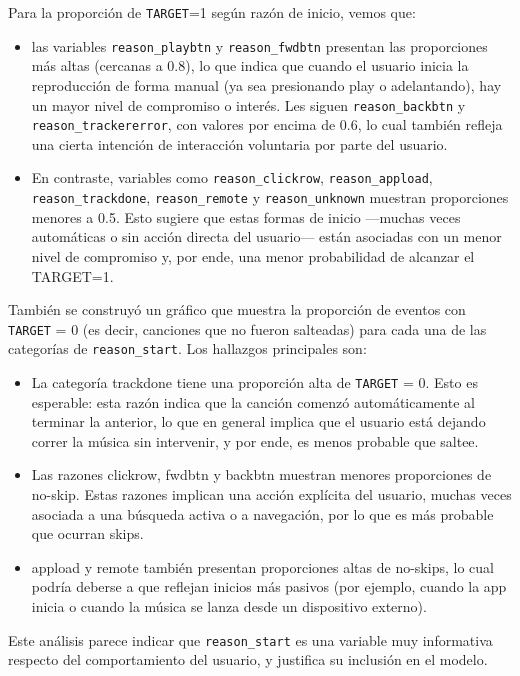 \documentclass{article}
\begin{document}
Para la proporción de \texttt{TARGET}=1 según razón de inicio, vemos que:

\begin{itemize}
	\item las variables \texttt{reason\_playbtn} y \texttt{reason\_fwdbtn} presentan las proporciones más altas (cercanas a 0.8), lo que indica que cuando el usuario inicia la reproducción de forma manual (ya sea presionando play o adelantando), hay un mayor nivel de compromiso o interés. Les siguen \texttt{reason\_backbtn} y \texttt{reason\_trackererror}, con valores por encima de 0.6, lo cual también refleja una cierta intención de interacción voluntaria por parte del usuario.
	\item En contraste, variables como \texttt{reason\_clickrow}, \texttt{reason\_appload}, \texttt{reason\_trackdone}, \texttt{reason\_remote} y \texttt{reason\_unknown} muestran proporciones menores a 0.5. Esto sugiere que estas formas de inicio —muchas veces automáticas o sin acción directa del usuario— están asociadas con un menor nivel de compromiso y, por ende, una menor probabilidad de alcanzar el TARGET=1.
\end{itemize}

También se construyó un gráfico que muestra la proporción de eventos con \texttt{TARGET} = 0 (es decir, canciones que no fueron salteadas) para cada una de las categorías de \texttt{reason\_start}.
Los hallazgos principales son:


\begin{itemize}
	\item La categoría trackdone tiene una proporción alta de \texttt{TARGET} = 0. Esto es esperable: esta razón indica que la canción comenzó automáticamente al terminar la anterior, lo que en general implica que el usuario está dejando correr la música sin intervenir, y por ende, es menos probable que saltee.
	\item Las razones clickrow, fwdbtn y backbtn muestran menores proporciones de no-skip. Estas razones implican una acción explícita del usuario, muchas veces asociada a una búsqueda activa o a navegación, por lo que es más probable que ocurran skips.
	\item appload y remote también presentan proporciones altas de no-skips, lo cual podría deberse a que reflejan inicios más pasivos (por ejemplo, cuando la app inicia o cuando la música se lanza desde un dispositivo externo).
\end{itemize}

Este análisis parece indicar que \texttt{reason\_start} es una variable muy informativa respecto del comportamiento del usuario, y justifica su inclusión en el modelo.
\end{document}
